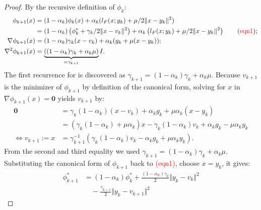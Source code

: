 \documentclass[12pt]{article}
\begin{document}
    \begin{proof}
        By the recursive definition of $\phi_k$: 
        \begin{align*}
            \phi_{k + 1}(x) 
            &= 
            (1 - \alpha_k)\phi_k(x) + \alpha_k (l_F(x; y_k) + \mu/2\Vert x - y_k\Vert^2)
            \\
            &= 
            (1 -\alpha_k)
            \left(
                \phi_k^* + \gamma_k/2\Vert x - v_k\Vert^2
            \right) 
            + 
            \alpha_k
            \left(
                l_F(x; y_k) + \mu/2\Vert x - y_k\Vert^2
            \right)
            \tag{\textcolor{red}{\text{eqn1}}}; 
            \\
            \nabla \phi_{k + 1}(x) 
            &= 
            (1 - \alpha_k)\gamma_k(x - v_k) + \alpha_k(g_k + \mu (x - y_k));
            \\
            \nabla^2 \phi_{k + 1}(x) &= 
            \underbrace{((1 - \alpha_k)\gamma_k + \alpha_k \mu)}_{=\gamma_{k + 1}}I. 
        \end{align*}
        The first recurrence for is discovered as $\gamma_{k + 1} = (1 - \alpha_k)\gamma_k + \alpha_k \mu$. 
        Because $v_{k + 1}$ is the minimizer of $\phi_{k+ 1}$ by definition of the canonical form, solving for $x$ in $\nabla \phi_{k + 1}(x) = \mathbf 0$ yields $v_{k + 1}$ by: 
        \begin{align*}
            \mathbf 0 &= 
            \gamma_k(1 - \alpha_k)(x - v_k) + \alpha_k g_k + \mu \alpha_k(x - y_k)
            \\
            &= (\gamma_k(1 - \alpha_k) + \mu \alpha_k)x - 
            \gamma_k(1 - \alpha_k)v_k + \alpha_k g_k - \mu \alpha_k y_k
            \\
            \iff 
            v_{k + 1} := x&=
            \gamma_{k +1}^{-1} 
            \left(
                \gamma_k(1 - \alpha_k) v_k - \alpha_k g_k + \mu \alpha_k y_k
            \right). 
        \end{align*}
        From the second and third equality we used $\gamma_{k + 1} = (1 - \alpha_k)\gamma_k + \alpha_k \mu$. 
        Substituting the canonical form of $\phi_{k + 1}$ back to \textcolor{red}{(eqn1)}, choose $x = y_k$, it gives: 
        \begin{align*}
            \phi_{k + 1}^* 
            &= (1 - \alpha_k)\phi_k^* + \frac{(1 - \alpha_k)\gamma_k}{2}\Vert y_k - v_k\Vert^2   
            \\
            & \quad 
            - \frac{\gamma_{k + 1}}{2}\Vert y_k - v_{k + 1}\Vert^2 

\end{align*}
\end{proof}
\end{document}
